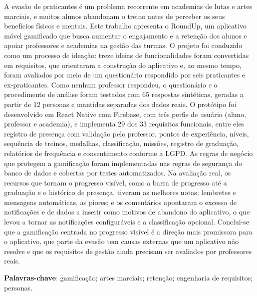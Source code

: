 \setlength{\absparsep}{18pt}
\begin{resumo}
\SingleSpacing
\noindent A evasão de praticantes é um problema recorrente em academias de
lutas e artes marciais, e muitos alunos abandonam o treino antes de
perceber os seus benefícios físicos e mentais. Este trabalho apresenta o
RoundUp, um aplicativo móvel gamificado que busca aumentar o engajamento e
a retenção dos alunos e apoiar professores e academias na gestão das
turmas. O projeto foi conduzido como um processo de ideação: treze ideias
de funcionalidades foram convertidas em requisitos, que orientaram a
construção do aplicativo e, ao mesmo tempo, foram avaliados por meio de um
questionário respondido por seis praticantes e ex-praticantes. Como nenhum
professor respondeu, o questionário e o procedimento de análise foram
testados com 65 respostas sintéticas, geradas a partir de 12 personas e
mantidas separadas dos dados reais. O protótipo foi desenvolvido em React
Native com Firebase, com três perfis de usuário (aluno, professor e
academia), e implementa 29 dos 33 requisitos funcionais, entre eles
registro de presença com validação pelo professor, pontos de experiência,
níveis, sequência de treinos, medalhas, classificação, missões, registro
de graduação, relatórios de frequência e consentimento conforme a LGPD. As
regras de negócio que protegem a gamificação foram implementadas nas
regras de segurança do banco de dados e cobertas por testes automatizados.
Na avaliação real, os recursos que tornam o progresso visível, como a
barra de progresso até a graduação e o histórico de presença, tiveram as
melhores notas; lembretes e mensagens automáticas, as piores; e os
comentários apontaram o excesso de notificações e de dados a inserir como
motivos de abandono do aplicativo, o que levou a tornar as notificações
configuráveis e a classificação opcional. Conclui-se que a gamificação
centrada no progresso visível é a direção mais promissora para o
aplicativo, que parte da evasão tem causas externas que um aplicativo não
resolve e que os requisitos de gestão ainda precisam ser avaliados por
professores reais.

\vspace{\onelineskip}
\noindent\textbf{Palavras-chave}: gamificação; artes marciais; retenção; engenharia de requisitos; personas.
\end{resumo}
